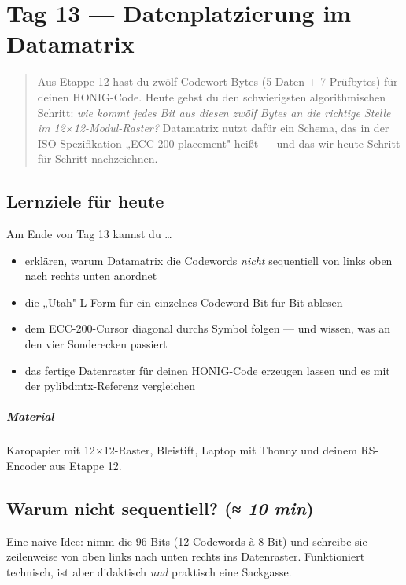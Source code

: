 \chapter{Tag 13 — Datenplatzierung im Datamatrix}

\begin{quote}
Aus Etappe 12 hast du zwölf Codewort-Bytes (5 Daten + 7 Prüfbytes)
für deinen HONIG-Code. Heute gehst du den schwierigsten algorithmischen
Schritt: \emph{wie kommt jedes Bit aus diesen zwölf Bytes an die
richtige Stelle im 12$\times$12-Modul-Raster?} Datamatrix nutzt dafür
ein Schema, das in der ISO-Spezifikation „ECC-200 placement" heißt —
und das wir heute Schritt für Schritt nachzeichnen.
\end{quote}

\section*{Lernziele für heute}

Am Ende von Tag 13 kannst du \dots

\begin{itemize}
\item erklären, warum Datamatrix die Codewords \emph{nicht} sequentiell
  von links oben nach rechts unten anordnet
\item die „Utah"-L-Form für ein einzelnes Codeword Bit für Bit ablesen
\item dem ECC-200-Cursor diagonal durchs Symbol folgen — und wissen,
  was an den vier Sonderecken passiert
\item das fertige Datenraster für deinen HONIG-Code erzeugen lassen
  und es mit der pylibdmtx-Referenz vergleichen
\end{itemize}

\paragraph{Material} Karopapier mit 12$\times$12-Raster, Bleistift,
Laptop mit Thonny und deinem RS-Encoder aus Etappe 12.

\section{Warum nicht sequentiell? \normalfont(\textit{≈ 10 min})}

Eine naive Idee: nimm die 96 Bits (12 Codewords à 8 Bit) und schreibe
sie zeilenweise von oben links nach unten rechts ins Datenraster.
Funktioniert technisch, ist aber didaktisch \emph{und} praktisch eine
Sackgasse.

